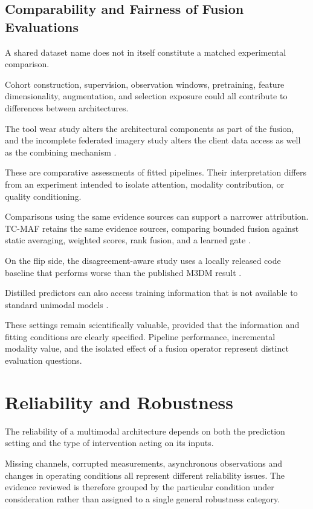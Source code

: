 \subsection{Comparability and Fairness of Fusion Evaluations}

A shared dataset name does not in itself constitute a matched experimental comparison.

Cohort construction, supervision, observation windows, pretraining, feature dimensionality,
augmentation, and selection exposure could all contribute to differences between architectures.

The tool wear study alters the architectural components as part of the fusion, and the incomplete
federated imagery study alters the client data access as well as the combining mechanism
\parencite{zhang_tool_2026,zhao_realtime_2026}.

These are comparative assessments of fitted pipelines. Their interpretation differs from an
experiment intended to isolate attention, modality contribution, or quality conditioning.

Comparisons using the same evidence sources can support a narrower attribution. TC-MAF retains the
same evidence sources, comparing bounded fusion against static averaging, weighted scores, rank
fusion, and a learned gate \parencite[Table~3]{deng_tc-maf_2026}.

On the flip side, the disagreement-aware study uses a locally released code baseline that performs
worse than the published M3DM result \parencite[Table~4]{xu_cross-modal_2026}.

Distilled predictors can also access training information that is not available to standard unimodal
models \parencite{li_pgmtkd_2025}.

These settings remain scientifically valuable, provided that the information and fitting conditions
are clearly specified. Pipeline performance, incremental modality value, and the isolated effect of
a fusion operator represent distinct evaluation questions.

\section{Reliability and Robustness}

The reliability of a multimodal architecture depends on both the prediction setting and the type of
intervention acting on its inputs.

Missing channels, corrupted measurements, asynchronous observations and changes in operating
conditions all represent different reliability issues. The evidence reviewed is therefore grouped by
the particular condition under consideration rather than assigned to a single general robustness
category.

